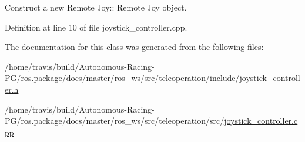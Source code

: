 Construct a new Remote Joy\+:\+: Remote Joy object. 



Definition at line 10 of file joystick\+\_\+controller.\+cpp.



The documentation for this class was generated from the following files\+:\begin{DoxyCompactItemize}
\item 
/home/travis/build/\+Autonomous-\/\+Racing-\/\+P\+G/ros.\+package/docs/master/ros\+\_\+ws/src/teleoperation/include/\hyperlink{joystick__controller_8h}{joystick\+\_\+controller.\+h}\item 
/home/travis/build/\+Autonomous-\/\+Racing-\/\+P\+G/ros.\+package/docs/master/ros\+\_\+ws/src/teleoperation/src/\hyperlink{joystick__controller_8cpp}{joystick\+\_\+controller.\+cpp}\end{DoxyCompactItemize}
